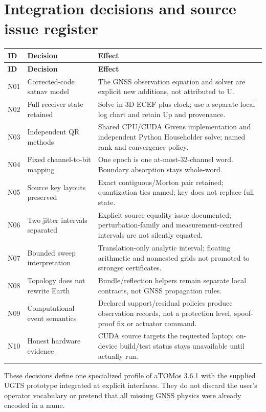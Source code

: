 \documentclass[11pt,a4paper]{article}
\begin{document}
\section{Integration decisions and source issue register}
\small
\begin{longtable}{@{}P{.075\textwidth}P{.28\textwidth}P{.575\textwidth}@{}}\toprule
\textbf{ID} & \textbf{Decision} & \textbf{Effect}\\\midrule
\endfirsthead
\toprule\textbf{ID} & \textbf{Decision} & \textbf{Effect}\\\midrule\endhead
N01 & Corrected-code satnav model & The GNSS observation equation and solver are explicit new additions, not attributed to U.\\
N02 & Full receiver state retained & Solve in 3D ECEF plus clock; use a separate local log chart and retain Up and provenance.\\
N03 & Independent QR methods & Shared CPU/CUDA Givens implementation and independent Python Householder solve; named rank and convergence policy.\\
N04 & Fixed channel-to-bit mapping & One epoch is one at-most-32-channel word. Boundary absorption stays whole-word.\\
N05 & Source key layouts preserved & Exact contiguous/Morton pair retained; quantization ties named; key does not replace full state.\\
N06 & Two jitter intervals separated & Explicit source equality issue documented; perturbation-family and measurement-centred intervals are not silently equated.\\
N07 & Bounded sweep interpretation & Translation-only analytic interval; floating arithmetic and nonnested grids not promoted to stronger certificates.\\
N08 & Topology does not rewrite Earth & Bundle/reflection helpers remain separate local contracts, not GNSS propagation rules.\\
N09 & Computational event semantics & Declared support/residual policies produce observation records, not a protection level, spoof-proof fix or actuator command.\\
N10 & Honest hardware evidence & CUDA source targets the requested laptop; on-device build/test status stays unavailable until actually run.\\\bottomrule
\end{longtable}
\normalsize

These decisions define one specialized profile of aTOMos 3.6.1 with the supplied UGTS
prototype integrated at explicit interfaces. They do not discard the user's operator
vocabulary or pretend that all missing GNSS physics were already encoded in a name.
\end{document}

